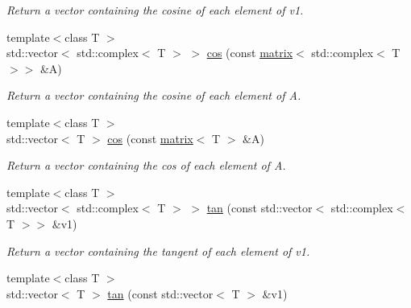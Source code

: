 \begin{DoxyCompactItemize}
\begin{DoxyCompactList}\small\item\em Return a vector containing the cosine of each element of v1. \end{DoxyCompactList}\item 
\hypertarget{namespacekeycpp_a6b8f8e6c241ddcb678acf54c03a89b08}{{\footnotesize template$<$class T $>$ }\\std\-::vector$<$ std\-::complex$<$ T $>$ $>$ \hyperlink{namespacekeycpp_a6b8f8e6c241ddcb678acf54c03a89b08}{cos} (const \hyperlink{classkeycpp_1_1matrix}{matrix}$<$ std\-::complex$<$ T $>$$>$ \&A)}\label{namespacekeycpp_a6b8f8e6c241ddcb678acf54c03a89b08}

\begin{DoxyCompactList}\small\item\em Return a vector containing the cosine of each element of A. \end{DoxyCompactList}\item 
\hypertarget{namespacekeycpp_abc28105b536bc99365073d7cbe0f9910}{{\footnotesize template$<$class T $>$ }\\std\-::vector$<$ T $>$ \hyperlink{namespacekeycpp_abc28105b536bc99365073d7cbe0f9910}{cos} (const \hyperlink{classkeycpp_1_1matrix}{matrix}$<$ T $>$ \&A)}\label{namespacekeycpp_abc28105b536bc99365073d7cbe0f9910}

\begin{DoxyCompactList}\small\item\em Return a vector containing the cos of each element of A. \end{DoxyCompactList}\item 
\hypertarget{namespacekeycpp_a1fbb76498765f30f7a95c80ce7491d28}{{\footnotesize template$<$class T $>$ }\\std\-::vector$<$ std\-::complex$<$ T $>$ $>$ \hyperlink{namespacekeycpp_a1fbb76498765f30f7a95c80ce7491d28}{tan} (const std\-::vector$<$ std\-::complex$<$ T $>$$>$ \&v1)}\label{namespacekeycpp_a1fbb76498765f30f7a95c80ce7491d28}

\begin{DoxyCompactList}\small\item\em Return a vector containing the tangent of each element of v1. \end{DoxyCompactList}\item 
\hypertarget{namespacekeycpp_ae4fe8a3edd9841d208cc044f79d48ae2}{{\footnotesize template$<$class T $>$ }\\std\-::vector$<$ T $>$ \hyperlink{namespacekeycpp_ae4fe8a3edd9841d208cc044f79d48ae2}{tan} (const std\-::vector$<$ T $>$ \&v1)}\label{namespacekeycpp_ae4fe8a3edd9841d208cc044f79d48ae2}


\end{DoxyCompactItemize}
